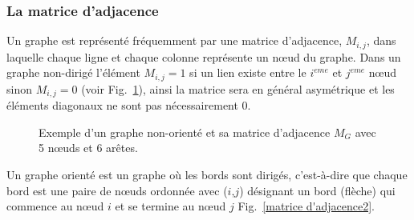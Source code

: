   \subsubsection{La matrice d’adjacence}
 Un graphe est représenté fréquemment par une matrice d'adjacence, $M_{i,j}$, dans laquelle chaque ligne et
 chaque colonne représente un nœud du graphe. Dans un graphe non-dirigé l'élément $M_{i,j}=1$ si un lien existe entre le $i^{eme}$ et $j^{eme}$
 nœud sinon $M_{i,j}=0$  (voir Fig.~\ref{matrice d'adjacence}), ainsi la matrice sera en général asymétrique et les éléments diagonaux ne sont pas
 nécessairement $0$.
  \begin{figure}[h]
 	\centering
 	\caption{Exemple d'un graphe non-orienté et sa matrice d'adjacence $M_G$ avec 5 nœuds et 6 arêtes.}
 	\label{matrice d'adjacence}
 \end{figure}  
 
  Un graphe orienté est un graphe où les bords sont dirigés, c'est-à-dire que chaque bord est une paire de nœuds ordonnée avec ($i$,$j$) désignant un bord (flèche) qui commence au nœud $i$ et se termine au nœud $j$ Fig.~\ref{matrice d'adjacence2}. 
 
